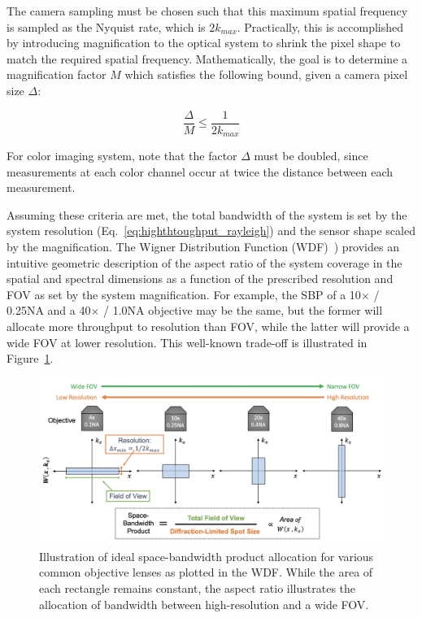 The camera sampling must be chosen such that this maximum spatial frequency is sampled as the Nyquist rate, which is $2k_{max}$. Practically, this is accomplished by introducing magnification to the optical system to shrink the pixel shape to match the required spatial frequency. Mathematically, the goal is to determine a magnification factor $M$ which satisfies the following bound, given a camera pixel size $\Delta$:

\begin{equation}
    \frac{\Delta}{M} \leq \frac{1}{2k_{max}}
\end{equation}

For color imaging system, note that the factor $\Delta$ must be doubled, since measurements at each color channel occur at twice the distance between each measurement.

Assuming these criteria are met, the total bandwidth of the system is set by the system resolution (Eq.~\ref{eq:highthtoughput_rayleigh}) and the sensor shape scaled by the magnification. The Wigner Distribution Function (WDF)~\cite{BASTIAANS197826}) provides an intuitive geometric description of the aspect ratio of the system coverage in the spatial and spectral dimensions as a function of the prescribed resolution and FOV as set by the system magnification. For example, the SBP of a 10$\times$ / 0.25NA and a 40$\times$ / 1.0NA objective may be the same, but the former will allocate more throughput to resolution than FOV, while the latter will provide a wide FOV at lower resolution. This well-known trade-off is illustrated in Figure~\ref{fig:highthroughput_sbp}.

\begin{figure}
  \centering
    \includegraphics[width=\textwidth]{figures/fig_highthroughput_sbp.png}
  \caption{\label{fig:highthroughput_sbp} Illustration of ideal space-bandwidth product allocation for various common objective lenses as plotted in the WDF. While the area of each rectangle remains constant, the aspect ratio illustrates the allocation of bandwidth between high-resolution and a wide FOV.}
\end{figure}

